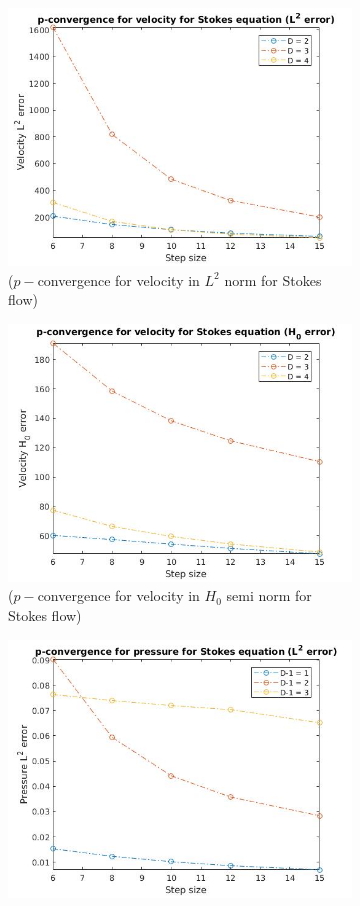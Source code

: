 \documentclass[a4paper,twoside,openright]{book}
\begin{document}
\begin{figure}
\begin{subfigure}{\textwidth}
\centering
  \includegraphics[width=0.8\linewidth]{p_conv_velocity_l2_stokes.jpg}
  \caption{($p-$convergence for velocity in $L^2$ norm for Stokes flow)}
  \label{p_convergence_velocity_l2}
\end{subfigure}
\begin{subfigure}{\textwidth}
\centering
  \includegraphics[width=0.8\linewidth]{p_conv_velocity_h0_stokes.jpg}
  \caption{($p-$convergence for velocity in $H_0$ semi norm for Stokes flow)}
  \label{p_convergence_velocity_h0}
\end{subfigure}
\begin{subfigure}{\textwidth}
\centering
  \includegraphics[width=0.8\linewidth]{p_conv_pressure_l2_stokes.jpg}

\end{subfigure}
\end{figure}
\end{document}
